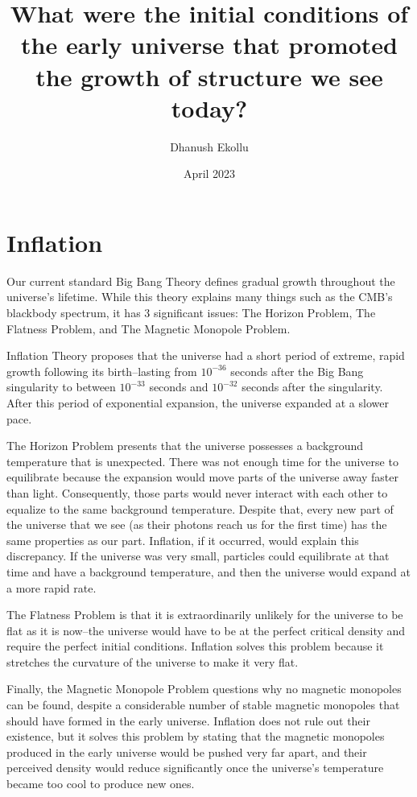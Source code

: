\documentclass[12pt]{article}
\title{What were the initial conditions of the early universe that promoted the growth of structure we see today?}
\author{Dhanush Ekollu}
\date{April 2023}
\begin{document}
\maketitle

\section{Inflation}
Our current standard Big Bang Theory defines gradual growth throughout the universe’s lifetime. While this theory explains many things such as the CMB’s blackbody spectrum, it has 3 significant issues: The Horizon Problem, The Flatness Problem, and The Magnetic Monopole Problem. 

Inflation Theory proposes that the universe had a short period of extreme, rapid growth following its birth–lasting from $10^{-36}$ seconds after the Big Bang singularity to between $10^{-33}$ seconds and $10^{-32}$ seconds after the singularity. After this period of exponential expansion, the universe expanded at a slower pace.

The Horizon Problem presents that the universe possesses a background temperature that is unexpected. There was not enough time for the universe to equilibrate because the expansion would move parts of the universe away faster than light. Consequently, those parts would never interact with each other to equalize to the same background temperature. Despite that, every new part of the universe that we see (as their photons reach us for the first time) has the same properties as our part. Inflation, if it occurred, would explain this discrepancy. If the universe was very small, particles could equilibrate at that time and have a background temperature, and then the universe would expand at a more rapid rate. 

The Flatness Problem is that it is extraordinarily unlikely for the universe to be flat as it is now–the universe would have to be at the perfect critical density and require the perfect initial conditions. Inflation solves this problem because it stretches the curvature of the universe to make it very flat.

Finally, the Magnetic Monopole Problem questions why no magnetic monopoles can be found, despite a considerable number of stable magnetic monopoles that should have formed in the early universe. Inflation does not rule out their existence, but it solves this problem by stating that the magnetic monopoles produced in the early universe would be pushed very far apart, and their perceived density would reduce significantly once the universe's temperature became too cool to produce new ones.
\end{document}
